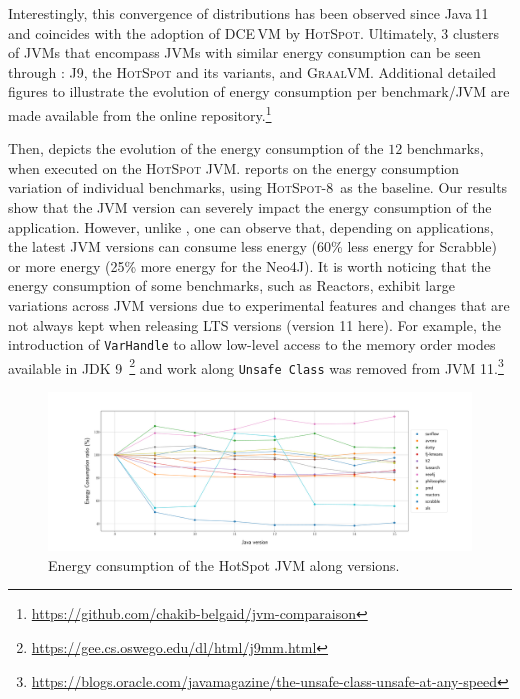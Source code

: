Interestingly, this convergence of distributions has been observed since Java\,11 and coincides with the adoption of DCE\,VM by \textsc{HotSpot}.
Ultimately, 3 clusters of JVMs that encompass JVMs with similar energy consumption can be seen through : \textsc{J9}, the \textsc{HotSpot} and its variants, and \textsc{GraalVM}.
Additional detailed figures to illustrate the evolution of energy consumption per benchmark/JVM are made available from the online repository.\footnote{\url{https://github.com/chakib-belgaid/jvm-comparaison}}

Then,  depicts the evolution of the energy consumption of the $12$ benchmarks, when executed on the \textsc{HotSpot} JVM.
 reports on the energy consumption variation of individual benchmarks, using \textsc{HotSpot-8}\ as the baseline.
Our results show that the JVM version can severely impact the energy consumption of the application.
However, unlike , one can observe that, depending on applications, the latest JVM versions can consume less energy (60\% less energy for \textsf{Scrabble}) or more energy (25\% more energy for the \textsf{Neo4J}).
It is worth noticing that the energy consumption of some benchmarks, such as \textsf{Reactors}, exhibit large variations across JVM versions due to experimental features and changes that are not always kept when releasing LTS versions (version 11 here).
For example, the introduction of \texttt{VarHandle} to allow low-level access to the memory order modes available in JDK 9~\footnote{\url{https://gee.cs.oswego.edu/dl/html/j9mm.html}} and work along \texttt{Unsafe Class} was removed from JVM 11.\footnote{\url{https://blogs.oracle.com/javamagazine/the-unsafe-class-unsafe-at-any-speed}}

\begin{figure}%
    \centering
    \includegraphics[width=\linewidth]{imgs/lineplothotspot_chetemi8_baseon8}
    \caption{Energy consumption of the HotSpot JVM along versions.}
    \label{fig:hotspot8}
\end{figure}

